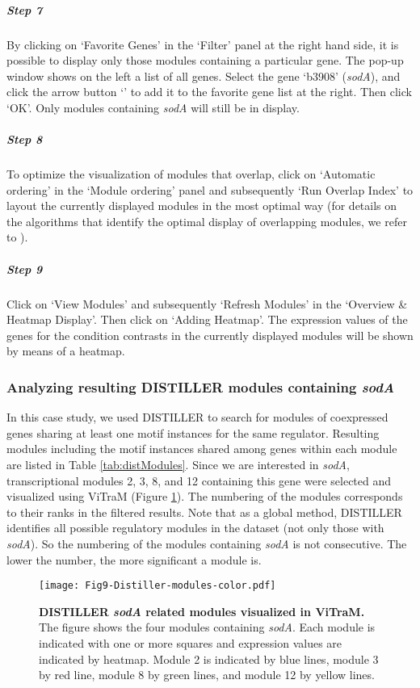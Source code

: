 \begin{small}
\subparagraph{Step 7} By clicking on `Favorite Genes' in the `Filter' panel 
at the right hand side, it is possible to display only those modules containing
a particular gene.
%
The pop-up window shows on the left a list of all genes. Select the gene
`b3908' (\textit{sodA}), and click the arrow button `\textrightarrow' to add it
to the favorite gene list at the right.  Then click `OK'.  Only modules
containing \textit{sodA} will still be in display.

\subparagraph{Step 8} To optimize the visualization of modules that overlap, 
click on `Automatic ordering' in the `Module ordering' panel and subsequently
`Run Overlap Index' to layout the currently displayed modules in the most
optimal way (for details on the algorithms that identify the optimal display of
overlapping modules, we refer to \cite{Sun2009}).

\subparagraph{Step 9} Click on `View Modules' and subsequently `Refresh 
Modules' in the `Overview \& Heatmap Display'. Then click on `Adding Heatmap'. 
The expression values of the genes for the condition contrasts in the currently 
displayed modules will be shown by means of a heatmap.

\end{small} %


\subsubsection{Analyzing resulting DISTILLER modules containing \textit{sodA}}

In this case study, we used DISTILLER to search for modules of coexpressed
genes sharing at least one motif instances for the same regulator.  Resulting
modules including the motif instances shared among genes within each module are
listed in Table \ref{tab:distModules}.  Since we are interested in
\textit{sodA}, transcriptional modules 2, 3, 8, and 12 containing this gene
were selected and visualized using ViTraM (Figure \ref{fig:vitram}).  
%
The numbering of the modules corresponds to their ranks in the filtered
results. Note that as a global method, DISTILLER identifies all possible
regulatory modules in the dataset (not only those with \textit{sodA}). So the
numbering of the modules containing \textit{sodA} is not consecutive. The lower
the number, the more significant a module is.

\begin{figure}[b]
	\centering
  	\texttt{[image: Fig9-Distiller-modules-color.pdf]}
	\caption[DISTILLER \textit{sodA} related modules visualized in ViTraM] 
	{\textbf{DISTILLER \textit{sodA} related modules visualized in ViTraM.}
	The figure shows the four modules containing \textit{sodA}. Each module is 
	indicated with one or more squares and expression values are indicated by 
	heatmap. Module 2 is indicated by blue lines, module 3 by red line, 
	module 8 by green lines, and module 12 by yellow lines.}
	\label{fig:vitram}
\end{figure}

